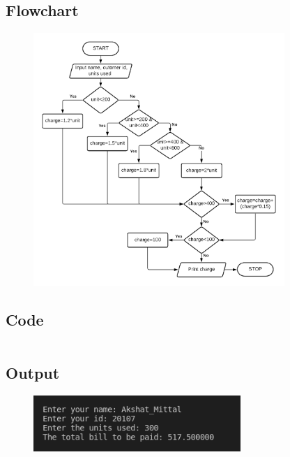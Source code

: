 \documentclass[12pt]{article}
\begin{document}
\subsection{Flowchart}
\begin{figure}[h]
    \centering
    \includegraphics[width=0.85\textwidth]{Flowchart09.png}
\end{figure}
\newpage
\subsection{Code}
\inputminted{c}{q9.c}
\subsection{Output}
\begin{figure}[h]
    \centering
    \includegraphics[width=0.7\textwidth]{9.png}
\end{figure}
\newpage
\section{}
\end{document}
